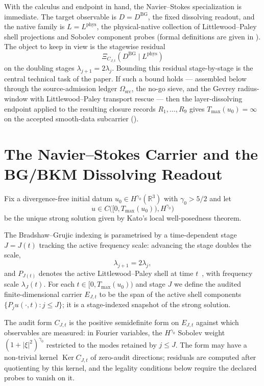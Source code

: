 \documentclass[11pt]{article}
\DeclareMathOperator{\Ker}{Ker}
\newcommand{\DBG}{D^{\mathrm{BG}}}
\newcommand{\Lphys}{L^{\mathrm{phys}}}
\newcommand{\Tmax}{T_{\max}}
\newcommand{\Omsrc}{\Omega_{\mathrm{src}}}
\newcommand{\lambdaJ}{\lambda_J}
\theoremstyle{definition}
\begin{document}
With the calculus and endpoint in hand, the Navier--Stokes
specialization is immediate.  The target observable is \(D=\DBG\), the
fixed dissolving readout, and the native family is \(L=\Lphys\), the
physical-native collection of Littlewood--Paley shell projections and
Sobolev component probes (formal definitions are given in
).  The object to keep in view is the stagewise
residual
\[
  \Xi_{C_{J,t}}(\DBG\mid\Lphys)
\]
on the doubling stages \(\lambda_{j+1}=2\lambda_j\).  Bounding this
residual stage-by-stage is the central technical task of the paper.
If such a bound holds --- assembled below through the source-admission
ledger \(\Omsrc\), the no-go sieve, and the Gevrey radius-window with
Littlewood--Paley transport rescue --- then the layer-dissolving
endpoint applied to the resulting closure records \(R_1,\ldots,R_9\)
gives \(\Tmax(u_0)=\infty\) on the accepted smooth-data subcarrier
().

 

\section{The Navier--Stokes Carrier and the BG/BKM Dissolving Readout}
\label{sec:ns-carrier}

Fix a divergence-free initial datum
\(u_0\in H^{\gamma_0}(\mathbb R^3)\) with \(\gamma_0>5/2\) and let
\[
  u\in C\bigl([0,\Tmax(u_0)),H^{\gamma_0}\bigr)
\]
be the unique strong solution given by Kato's local well-posedness
theorem.

The Bradshaw--Grujic indexing is parametrised by a time-dependent
stage \(J=J(t)\) tracking the active frequency scale: advancing the
stage doubles the scale,
\[
  \lambda_{j+1}=2\lambda_j ,
\]
and \(P_{J(t)}\) denotes the active Littlewood--Paley shell at time
\(t\)~\citep{Stein1970,Grafakos2014,BahouriCheminDanchin2011}, with
frequency scale \(\lambdaJ(t)\).  For each \(t\in[0,\Tmax(u_0))\) and
stage \(J\) we define the audited finite-dimensional carrier
\(E_{J,t}\) to be the span of the active shell components
\(\{P_j u(\cdot,t):j\le J\}\); it is a stage-indexed snapshot of the
strong solution.

The audit form \(C_{J,t}\) is the positive semidefinite form on
\(E_{J,t}\) against which observables are measured: in Fourier
variables, the \(H^{\gamma_0}\) Sobolev weight \((1+|\xi|^2)^{\gamma_0}\)
restricted to the modes retained by \(j\le J\).  The form may have a
non-trivial kernel \(\Ker C_{J,t}\) of zero-audit directions; residuals
are computed after quotienting by this kernel, and the legality
conditions below require the declared probes to vanish on it.
\end{document}
